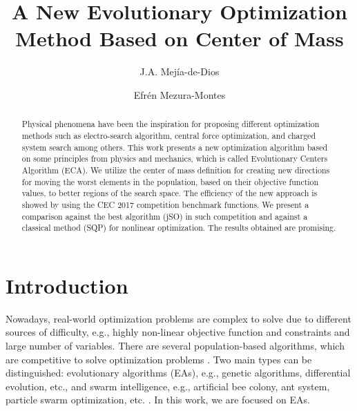 \documentclass{svproc}
\begin{document}
\mainmatter              %

\title{A New Evolutionary Optimization Method Based on Center of Mass}
%

\author{J.A. Mej\'ia-de-Dios \and Efr\'en Mezura-Montes}
%
%

\maketitle

\begin{abstract}
Physical phenomena have been the inspiration for proposing different
optimization methods such as electro-search algorithm, central force 
optimization, and charged system search among others. This work presents a new 
optimization algorithm based on some principles from physics and
mechanics, which is called Evolutionary Centers Algorithm (ECA). We utilize 
the center of mass definition for creating new directions for moving the worst 
elements in the population,  based on their objective function values, %
to better regions of the search space.  The efficiency of the new approach is showed by using the 
CEC 2017 competition benchmark functions. We present a comparison against the best algorithm (jSO) 
in such competition and against a classical method (SQP) for nonlinear optimization.  The results obtained are promising.
\end{abstract}

\section{Introduction}
Nowadays, real-world optimization problems  are complex to solve due to 
different sources of difficulty, e.g., highly  non-linear objective function 
and constraints and large number of variables. There are several population-based 
algorithms, which are competitive to solve optimization problems \cite{easSurv}.  
Two main  types can be distinguished:  evolutionary algorithms (EAs), e.g., genetic algorithms, 
differential evolution, etc., \cite{jso2017,melanie96,ed1995} and swarm 
intelligence, e.g., artificial bee colony, ant system, particle swarm optimization, etc.
\cite{abc2005,pso1995}. In this work, we are focused on EAs.\\
\end{document}
